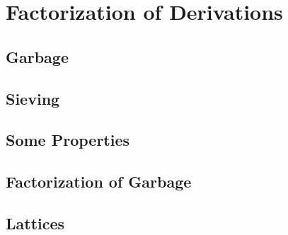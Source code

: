 \chapter{Factorization of Derivations}

\section{Garbage}

\section{Sieving}

\section{Some Properties}

\section{Factorization of Garbage}

\section{Lattices}
